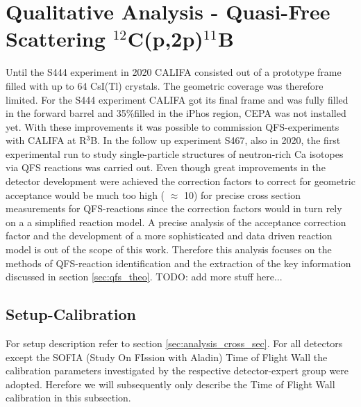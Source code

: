 \section{Qualitative Analysis - Quasi-Free Scattering $^{12}$C(p,2p)$^{11}$B}
Until the S444 experiment in 2020 CALIFA consisted out of a prototype frame filled with up to 64 CsI(Tl) crystals. The geometric coverage was therefore limited. For the S444 experiment CALIFA got its final frame and was fully filled in the forward barrel and 35\%filled in the iPhos region, CEPA was not installed yet. With these improvements it was possible to commission QFS-experiments with CALIFA at R$^3$B. In the follow up experiment S467, also in 2020, the first experimental run to study single-particle structures of neutron-rich Ca isotopes via QFS reactions was carried out.\newline
Even though great improvements in the detector development  were achieved the correction factors to correct for geometric acceptance would be much too high ( $\approx$ 10) for precise cross section measurements for QFS-reactions since the correction factors would in turn rely on a a simplified reaction model. A precise analysis of the acceptance correction factor and the development of a more sophisticated and data driven reaction model is out of the scope of this work. Therefore this analysis focuses on the methods of QFS-reaction identification and the extraction of the key information discussed in section \ref{sec:qfs_theo}. TODO: add more stuff here...\newline
\subsection{Setup-Calibration}
For setup description refer to section \ref{sec:analysis_cross_sec}. For all detectors except the SOFIA (Study On FIssion with Aladin) Time of Flight Wall the calibration parameters investigated by the respective detector-expert group were adopted. Herefore we will subsequently only describe the Time of Flight Wall calibration in this subsection.
